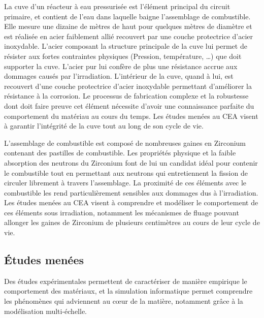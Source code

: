 \documentclass[11pt,class=article,float=false,crop=false]{standalone}
\begin{document}
La cuve d'un réacteur à eau pressurisée est l'élément principal du circuit primaire, et contient de l'eau dans laquelle baigne l'assemblage de combustible. Elle mesure une dizaine de mètres de haut pour quelques mètres de diamètre et est réalisée en acier faiblement allié  recouvert par une couche protectrice d'acier inoxydable. L'acier composant la structure principale de la cuve lui permet de résister aux fortes contraintes physiques (Pression, température, \dots) que doit supporter la cuve. L'acier pur lui confère de plus une résistance accrue aux dommages causés par l'irradiation. L'intérieur de la cuve, quand à lui, est recouvert d'une couche protectrice d'acier inoxydable permettant d'améliorer la résistance à la corrosion. Le processus de fabrication complexe et la robustesse dont doit faire preuve cet élément nécessite d'avoir une connaissance parfaite du comportement du matériau au cours du temps. Les études menées au CEA visent à garantir l'intégrité de la cuve tout au long de son cycle de vie.

L'assemblage de combustible est composé de nombreuses gaines en Zirconium contenant des pastilles de combustible. Les propriétés physique et la faible absorption des neutrons du Zirconium font de lui un candidat idéal pour contenir le combustible tout en permettant aux neutrons qui entretiennent la fission de circuler librement à travers l'assemblage. La proximité de ces éléments avec le combustible les rend particulièrement sensibles aux dommages dus à l'irradiation. Les études menées au CEA visent à comprendre et modéliser le comportement de ces éléments sous irradiation, notamment les mécanismes de fluage pouvant allonger les gaines de Zirconium de plusieurs centimètres au cours de leur cycle de vie.

\subsection*{Études menées}
Des études expérimentales permettent de caractériser de manière empirique le comportement des matériaux, et la simulation informatique permet comprendre les phénomènes qui adviennent au cœur de la matière, notamment grâce à la modélisation multi-échelle.
\end{document}
